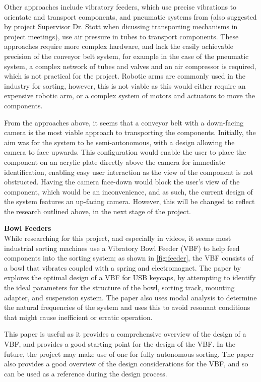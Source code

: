 Other approaches include vibratory feeders\cite{s21217280}, which use precise vibrations to orientate and transport components, and pneumatic systems from \citet{ASEC2023-16267} (also suggested by project Supervisor Dr. Stott when dicussing transporting mechanisms in project meetings), use air pressure in tubes to transport components.
These approaches require more complex hardware, and lack the easily achievable precision of the conveyor belt system, for example in the case of the pneumatic system, a complex network of tubes and valves and an air compressor
is required, which is not practical for the project. Robotic arms are commonly used in the industry for sorting, however, this is not viable as this would either require an expensive robotic arm, or a complex system of motors and actuators to move the components.

From the approaches above, it seems that a conveyor belt with a down-facing camera is the most viable approach to transporting the components. Initially, the aim was for the system to be semi-autonomous, with a design allowing the camera to face upwards.
This configuration would enable the user to place the component on an acrylic plate directly above the camera for immediate identification, enabling easy user interaction as the view of the component is not obstructed. 
Having the camera face-down would block the user's view of the component, which would be an inconvenience, and as such, the current design of the system features an up-facing camera. However, 
this will be changed to reflect the research outlined above, in the next stage of the project.

\noindent
\textbf{Bowl Feeders} \\
While researching for this project, and especially in videos\cite{videobowlfeeder}, it seems most industrial sorting machines use a Vibratory Bowl Feeder (VBF) to help feed components into the sorting system;
as shown in \autoref{fig:feeder}, the VBF consists of a bowl that vibrates coupled with a spring and electromagnet.
The paper by \citet{nam2019design} explores the optimal design of a VBF for USB keycaps, by attempting to identify the ideal parameters for the structure of the bowl,
sorting track, mounting adapter, and suspension system. The paper also uses modal analysis to determine the natural frequencies of the system and uses this to
avoid resonant conditions that might cause inefficient or erratic operation.

This paper is useful as it provides a comprehensive overview of the design of a VBF, and provides a good starting point for the design of the VBF. In the future,
the project may make use of one for fully autonomous sorting. The paper also provides a good overview of the design considerations for the VBF, and so can be used as a reference
during the design process.

